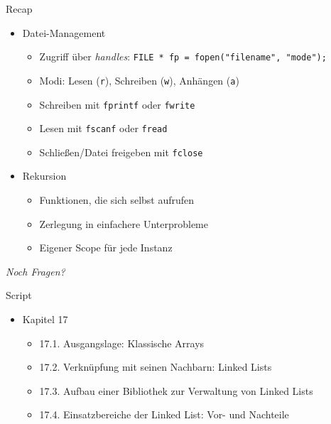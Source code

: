 
\begin{frame}[t,plain]
\titlepage
\end{frame}


\begin{frame}[fragile]{Recap}
%
\begin{itemize}
\item Datei-Management
	\begin{itemize}
	\item Zugriff über \emph{handles}:\tabto{4cm} \texttt{FILE * fp = fopen("filename", "mode");}
	\item Modi: Lesen (\texttt{r}), Schreiben (\texttt{w}), Anhängen (\texttt{a})
	\item Schreiben mit \texttt{fprintf} oder \texttt{fwrite}
	\item Lesen mit \texttt{fscanf} oder \texttt{fread}
	\item Schließen/Datei freigeben mit \texttt{fclose}
	\end{itemize}
\item Rekursion
	\begin{itemize}
	\item Funktionen, die sich selbst aufrufen
	\item Zerlegung in einfachere Unterprobleme
	\item Eigener Scope für jede Instanz
	\end{itemize}
\end{itemize}
%
\begin{center}
	\emph{Noch Fragen?}
\end{center}
%
\end{frame}


\begin{frame}{Script}

\begin{itemize}
\item Kapitel 17
	\begin{itemize}
	\item 17.1. Ausgangslage: Klassische Arrays
	\item 17.2. Verknüpfung mit seinen Nachbarn: Linked Lists
	\item 17.3. Aufbau einer Bibliothek zur Verwaltung von Linked Lists
	\item 17.4. Einsatzbereiche der Linked List: Vor- und Nachteile 
	\end{itemize}
\end{itemize}

\end{frame}

